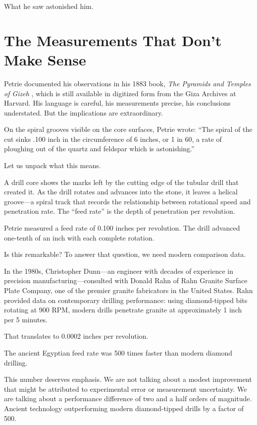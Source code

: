 \documentclass[11pt]{article}
\begin{document}
What he saw astonished him.

\section{The Measurements That Don't Make Sense}

Petrie documented his observations in his 1883 book, \textit{The Pyramids and Temples of Gizeh} \citep{Petrie1883}, which is still available in digitized form from the Giza Archives at Harvard. His language is careful, his measurements precise, his conclusions understated. But the implications are extraordinary.

On the spiral grooves visible on the core surfaces, Petrie wrote: ``The spiral of the cut sinks .100 inch in the circumference of 6 inches, or 1 in 60, a rate of ploughing out of the quartz and feldspar which is astonishing.''

Let us unpack what this means.

A drill core shows the marks left by the cutting edge of the tubular drill that created it. As the drill rotates and advances into the stone, it leaves a helical groove---a spiral track that records the relationship between rotational speed and penetration rate. The ``feed rate'' is the depth of penetration per revolution.

Petrie measured a feed rate of 0.100 inches per revolution. The drill advanced one-tenth of an inch with each complete rotation.

Is this remarkable? To answer that question, we need modern comparison data.

In the 1980s, Christopher Dunn---an engineer with decades of experience in precision manufacturing---consulted with Donald Rahn of Rahn Granite Surface Plate Company, one of the premier granite fabricators in the United States. Rahn provided data on contemporary drilling performance: using diamond-tipped bits rotating at 900 RPM, modern drills penetrate granite at approximately 1 inch per 5 minutes.

That translates to 0.0002 inches per revolution.

The ancient Egyptian feed rate was 500 times faster than modern diamond drilling.

This number deserves emphasis. We are not talking about a modest improvement that might be attributed to experimental error or measurement uncertainty. We are talking about a performance difference of two and a half orders of magnitude. Ancient technology outperforming modern diamond-tipped drills by a factor of 500.
\end{document}
